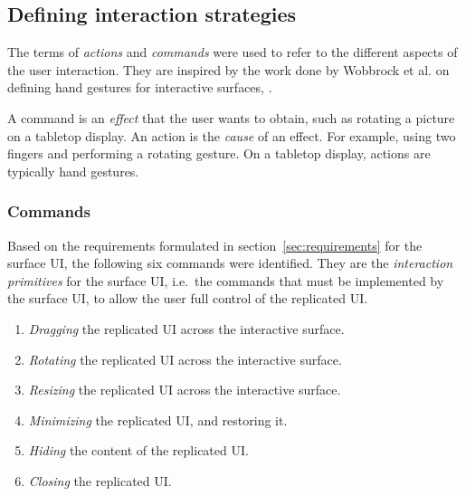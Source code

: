 
\subsection{Defining interaction strategies}
\label{sec:strategies}

The terms of \emph{actions} and \emph{commands} were used to refer to the different aspects of the user interaction.
They are inspired by the work done by Wobbrock et al. on defining hand gestures for interactive surfaces, \citep{Wobbrock:2009:gestures}.

A command is an \emph{effect} that the user wants to obtain, such as rotating a picture on a tabletop display.
An action is the \emph{cause} of an effect.
For example, using two fingers and performing a rotating gesture.
On a tabletop display, actions are typically hand gestures.


\subsubsection{Commands}

Based on the requirements formulated in section~\ref{sec:requirements} for the surface UI, the following six commands were identified.
They are the \emph{interaction primitives} for the surface UI, i.e.\ the commands that must be implemented by the surface UI, to allow the user full control of the replicated UI.

\begin{enumerate}
\item{\emph{Dragging} the replicated UI across the interactive surface.}
\item{\emph{Rotating} the replicated UI across the interactive surface.}
\item{\emph{Resizing} the replicated UI across the interactive surface.}
\item{\emph{Minimizing} the replicated UI, and restoring it.}
\item{\emph{Hiding} the content of the replicated UI.}
\item{\emph{Closing} the replicated UI.}
\end{enumerate}

